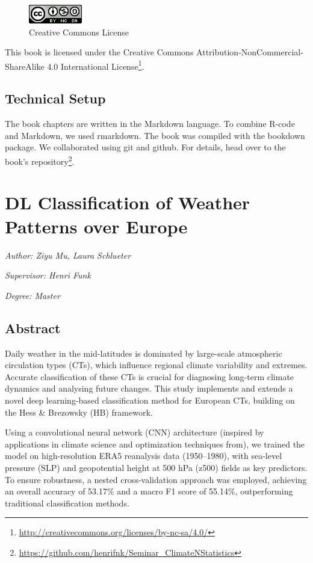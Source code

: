 \documentclass[
]{krantz}
\renewcommand{\href}[2]{#2\footnote{\url{#1}}}
\begin{document}
\begin{figure}
\centering
\includegraphics{by-nc-sa.png}
\caption{Creative Commons License}
\end{figure}

This book is licensed under the \href{http://creativecommons.org/licenses/by-nc-sa/4.0/}{Creative Commons Attribution-NonCommercial-ShareAlike 4.0 International License}.

\mainmatter

\section*{Technical Setup}\label{technical-setup}


The book chapters are written in the Markdown language.
To combine R-code and Markdown, we used rmarkdown.
The book was compiled with the bookdown package.
We collaborated using git and github.
For details, head over to the \href{https://github.com/henrifnk/Seminar_ClimateNStatistics}{book's repository}.

\chapter{DL Classification of Weather Patterns over Europe}\label{sm}

\emph{Author: Ziyu Mu, Laura Schlueter}

\emph{Supervisor: Henri Funk}

\emph{Degree: Master}

\section{Abstract}\label{abstract}

Daily weather in the mid-latitudes is dominated by large-scale atmospheric circulation types (CTs), which influence regional climate variability and extremes.
Accurate classification of these CTs is crucial for diagnosing long-term climate dynamics and analysing future changes. This study implements and extends a novel deep learning-based classification method for European CTs, building on the Hess \& Brezowsky (HB) framework.

Using a convolutional neural network (CNN) architecture (inspired by applications in climate science and optimization techniques from), we trained the model on high-resolution ERA5 reanalysis data (1950--1980), with sea-level pressure (SLP) and geopotential height at 500 hPa (z500) fields as key predictors. To ensure robustness, a nested cross-validation approach was employed, achieving an overall accuracy of 53.17\% and a macro F1 score of 55.14\%, outperforming traditional classification methods.
\end{document}
